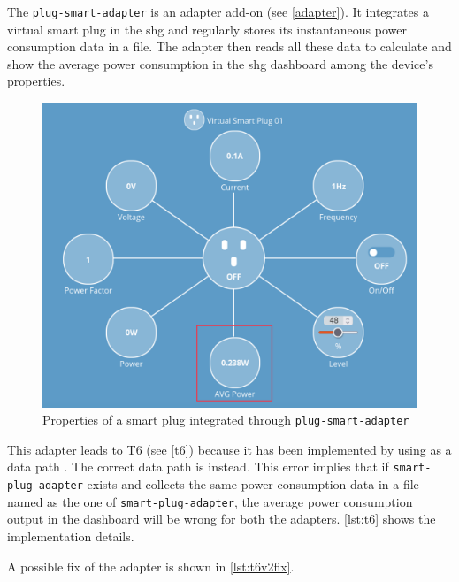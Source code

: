 The \texttt{plug-smart-adapter} is an adapter add-on (see \autoref{adapter}). It integrates a virtual smart plug in the \gls{shg} and regularly stores its instantaneous power consumption data in a file. The adapter then reads all these data to calculate and show the average power consumption in the \gls{shg} dashboard among the device's properties. 

\begin{figure}[H]
    \centering
    \includegraphics[scale=0.38]{images/addons/avg.png}
    \caption{Properties of a smart plug integrated through \texttt{plug-smart-adapter}}
\end{figure}

This adapter leads to T6 (see \autoref{t6}) because it has been implemented by using as a data path . The correct data path is  instead. This error implies that if \texttt{smart-plug-adapter} exists and collects the same power consumption data in a file named as the one of \texttt{smart-plug-adapter}, the average power consumption output in the dashboard will be wrong for both the adapters. \autoref{lst:t6} shows the implementation details.

A possible fix of the adapter is shown in \autoref{lst:t6v2fix}.

